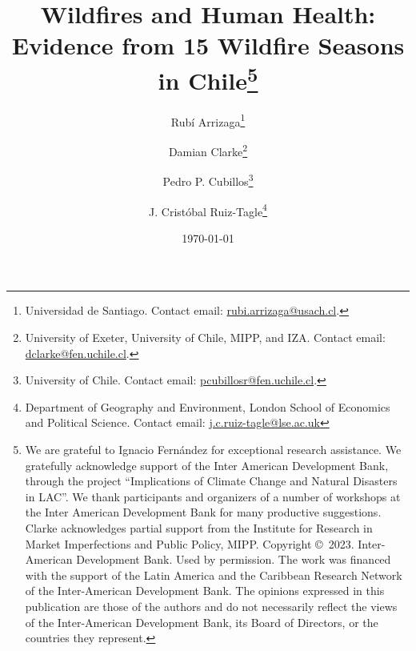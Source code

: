 \documentclass[11pt]{article}
\begin{document}
\title{\textbf{Wildfires and Human Health: Evidence from 15 Wildfire Seasons in Chile}\thanks{We are grateful to Ignacio Fernández for exceptional research assistance. %
We gratefully acknowledge support of the Inter American Development Bank, through the project ``Implications of Climate Change and Natural Disasters in LAC''. We thank participants and organizers of a number of workshops at the Inter American Development Bank for many productive suggestions. Clarke acknowledges partial support from the Institute for Research in Market Imperfections and Public Policy, MIPP. 
Copyright \copyright\ 2023. Inter-American Development Bank. Used by permission. The work was financed with the support of the Latin America and the Caribbean Research Network of the Inter-American Development Bank. The opinions expressed in this publication are those of the authors and do not necessarily reflect the views of the Inter-American Development Bank, its Board of Directors, or the countries they represent.}} %
\author{Rub\'i Arrizaga\thanks{Universidad de Santiago.  Contact email: \href{mailto: rubi.arrizaga@usach.cl}{rubi.arrizaga@usach.cl}.}
  \and Damian Clarke\thanks{University of Exeter, University of Chile, MIPP, and IZA.  Contact email: \href{mailto:dclarke@fen.uchile.cl}{dclarke@fen.uchile.cl}.}
    \and Pedro P. Cubillos\thanks{University of Chile.  Contact email: \href{mailto:pcubillosr@fen.uchile.cl}{pcubillosr@fen.uchile.cl}.}
\and J. Crist\'obal Ruiz-Tagle\thanks{Department of Geography and Environment, London School of Economics and Political Science.  Contact email: \href{mailto:j.c.ruiz-tagle@lse.ac.uk}{j.c.ruiz-tagle@lse.ac.uk}}}
\date{\today}

\renewcommand{\thefootnote}{\arabic{footnote}}
\setcounter{footnote}{0} 
\thispagestyle{empty}
\maketitle
\end{document}
